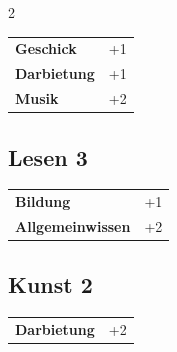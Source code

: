 \begin{multicols}{2}
\begin{tcolorbox}
\begin{tabular}{@{}ll@{}}
    \textbf{Geschick} & +1\\
    \textbf{Darbietung} & +1\\
    \textbf{Musik} & +2\\
\end{tabular}


\end{tcolorbox}

\begin{tcolorbox}
    \subsection*{Lesen \hfill \small{3 }}
    \tcblower




\begin{tabular}{@{}ll@{}}
    \textbf{Bildung} & +1\\
    \textbf{Allgemeinwissen} & +2\\
\end{tabular}


\end{tcolorbox}

\begin{tcolorbox}
    \subsection*{Kunst \hfill \small{2 }}
    \tcblower




\begin{tabular}{@{}ll@{}}
    \textbf{Darbietung} & +2\\
\end{tabular}



\end{tcolorbox}
\end{multicols}
